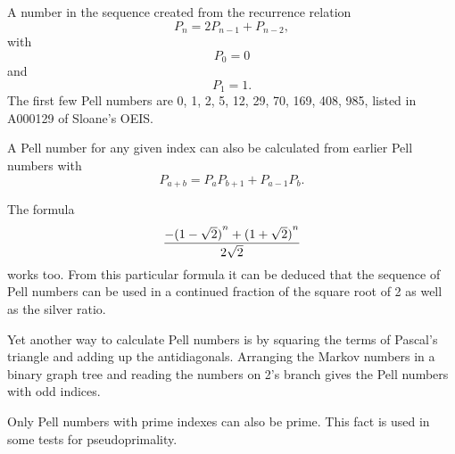 \documentclass[12pt]{article}
\begin{document}
A number in the sequence created from the recurrence relation $$P_n = 2P_{n - 1} + P_{n - 2},$$ with $$P_0 = 0$$ and $$P_1 = 1.$$ The first few Pell numbers are 0, 1, 2, 5, 12, 29, 70, 169, 408, 985, listed in A000129 of Sloane's OEIS.

A Pell number for any given index can also be calculated from earlier Pell numbers with $$P_{a + b} = P_aP_{b + 1} + P_{a - 1}P_b.$$

The formula $${ {-{(1 - \sqrt 2)}^n + {(1 + \sqrt 2)}^n} \over {2\sqrt 2}}$$ works too. From this particular formula it can be deduced that the sequence of Pell numbers can be used in a continued fraction of the square root of 2 as well as the silver ratio.

Yet another way to calculate Pell numbers is by squaring the terms of Pascal's triangle and adding up the antidiagonals. Arranging the Markov numbers in a binary graph tree and reading the numbers on 2's branch gives the Pell numbers with odd indices.

Only Pell numbers with prime indexes can also be prime. This fact is used in some tests for pseudoprimality.
\end{document}
